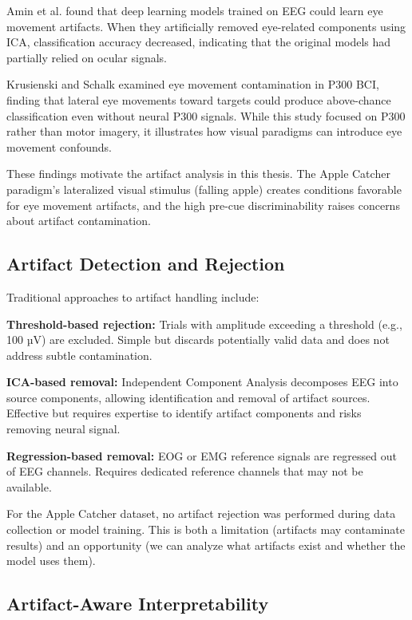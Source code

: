 Amin et al. \cite{amin2019deep} found that deep learning models trained on EEG could learn eye movement artifacts. When they artificially removed eye-related components using ICA, classification accuracy decreased, indicating that the original models had partially relied on ocular signals.

Krusienski and Schalk \cite{krusienski2011eye} examined eye movement contamination in P300 BCI, finding that lateral eye movements toward targets could produce above-chance classification even without neural P300 signals. While this study focused on P300 rather than motor imagery, it illustrates how visual paradigms can introduce eye movement confounds.

These findings motivate the artifact analysis in this thesis. The Apple Catcher paradigm's lateralized visual stimulus (falling apple) creates conditions favorable for eye movement artifacts, and the high pre-cue discriminability raises concerns about artifact contamination.


\subsection{Artifact Detection and Rejection}
\label{subsec:rw_artifact_rejection}

Traditional approaches to artifact handling include:

\textbf{Threshold-based rejection:} Trials with amplitude exceeding a threshold (e.g., 100 µV) are excluded. Simple but discards potentially valid data and does not address subtle contamination.

\textbf{ICA-based removal:} Independent Component Analysis decomposes EEG into source components, allowing identification and removal of artifact sources. Effective but requires expertise to identify artifact components and risks removing neural signal.

\textbf{Regression-based removal:} EOG or EMG reference signals are regressed out of EEG channels. Requires dedicated reference channels that may not be available.

For the Apple Catcher dataset, no artifact rejection was performed during data collection or model training. This is both a limitation (artifacts may contaminate results) and an opportunity (we can analyze what artifacts exist and whether the model uses them).


\subsection{Artifact-Aware Interpretability}
\label{subsec:rw_artifact_aware}

